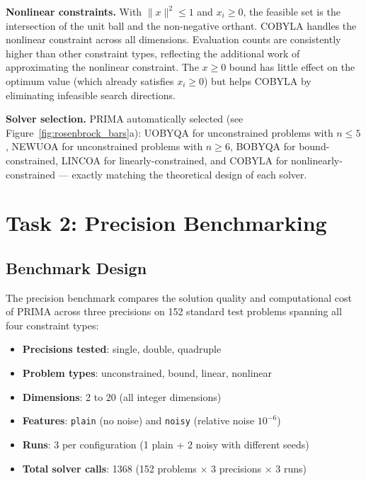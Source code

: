 \documentclass[11pt,a4paper]{article}
\begin{document}
\textbf{Nonlinear constraints.} With $\lVert x\rVert^2 \le 1$ and $x_i \ge 0$,
the feasible set is the intersection of the unit ball and the non-negative
orthant. COBYLA handles the nonlinear constraint across all dimensions.
Evaluation counts are consistently higher than other constraint types,
reflecting the additional work of approximating the nonlinear constraint.
The $x \ge 0$ bound has little effect on the optimum value (which already
satisfies $x_i \ge 0$) but helps COBYLA by eliminating infeasible search
directions.

\textbf{Solver selection.} PRIMA automatically selected (see Figure~\ref{fig:rosenbrock_bars}a):
UOBYQA for unconstrained problems with $n \le 5$, NEWUOA for unconstrained
problems with $n \ge 6$, BOBYQA for bound-constrained, LINCOA for
linearly-constrained, and COBYLA for nonlinearly-constrained --- exactly
matching the theoretical design of each solver.

\section{Task 2: Precision Benchmarking}

\subsection{Benchmark Design}

The precision benchmark compares the solution quality and computational cost
of PRIMA across three precisions on 152 standard test problems spanning all
four constraint types:

\begin{itemize}[noitemsep]
    \item \textbf{Precisions tested}: single, double, quadruple
    \item \textbf{Problem types}: unconstrained, bound, linear, nonlinear
    \item \textbf{Dimensions}: 2 to 20 (all integer dimensions)
    \item \textbf{Features}: \texttt{plain} (no noise) and \texttt{noisy} (relative noise $10^{-6}$)
    \item \textbf{Runs}: 3 per configuration (1 plain + 2 noisy with different seeds)
    \item \textbf{Total solver calls}: 1368 (152 problems $\times$ 3 precisions $\times$ 3 runs)
\end{itemize}
\end{document}
